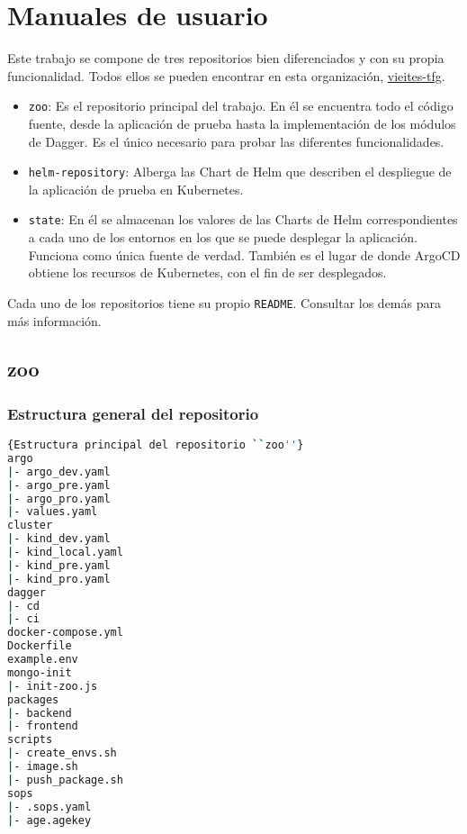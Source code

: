 \chapter{Manuales de usuario}
\label{chap:usuario}
%
Este trabajo se compone de tres repositorios bien diferenciados y con su propia funcionalidad. Todos ellos se pueden encontrar en esta organización, \href{https://github.com/vieites-tfg}{vieites-tfg}.

\begin{itemize}
  \item \texttt{zoo}: Es el repositorio principal del trabajo. En él se encuentra todo el código fuente, desde la aplicación de prueba hasta la implementación de los módulos de Dagger. Es el único necesario para probar las diferentes funcionalidades.
  \item \texttt{helm-repository}: Alberga las Chart de Helm que describen el despliegue de la aplicación de prueba en Kubernetes.
  \item \texttt{state}: En él se almacenan los valores de las Charts de Helm correspondientes a cada uno de los entornos en los que se puede desplegar la aplicación. Funciona como única fuente de verdad. También es el lugar de donde ArgoCD obtiene los recursos de Kubernetes, con el fin de ser desplegados.
\end{itemize}

Cada uno de los repositorios tiene su propio \texttt{README}. Consultar los demás para más información.

\section{zoo}

\subsection*{Estructura general del repositorio}

\begin{lstlisting}[language=bash,label=lst:zoo-structure]{Estructura principal del repositorio ``zoo''}
argo
|- argo_dev.yaml
|- argo_pre.yaml
|- argo_pro.yaml
|- values.yaml
cluster
|- kind_dev.yaml
|- kind_local.yaml
|- kind_pre.yaml
|- kind_pro.yaml
dagger
|- cd
|- ci
docker-compose.yml
Dockerfile
example.env
mongo-init
|- init-zoo.js
packages
|- backend
|- frontend
scripts
|- create_envs.sh
|- image.sh
|- push_package.sh
sops
|- .sops.yaml
|- age.agekey
\end{lstlisting}


